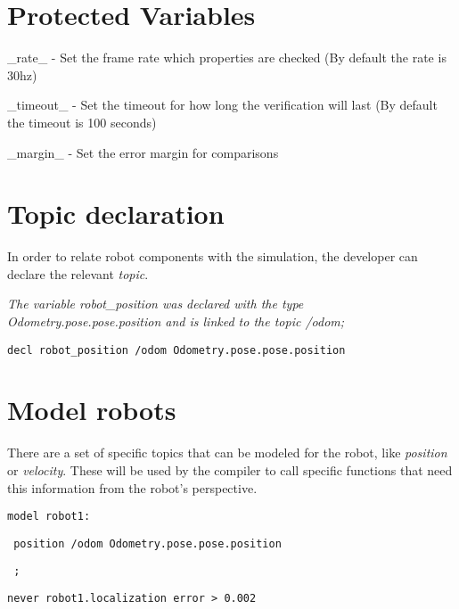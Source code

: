 \section{Protected Variables}

\_rate\_ - Set the frame rate which properties are checked (By default the rate is 30hz)

\_timeout\_ - Set the timeout for how long the verification will last (By default the timeout is 100 seconds)

\_margin\_ - Set the error margin for comparisons

\section{Topic declaration}

In order to relate robot components with the simulation, the developer can declare the relevant \textit{topic}.

\textit{The variable robot\_position was declared with the type Odometry.pose.pose.position and is linked to the topic /odom;}

\vspace{2mm}

\texttt{decl robot\_position /odom Odometry.pose.pose.position}

\section{Model robots}

There are a set of specific topics that can be modeled for the robot, like \textit{position} or \textit{velocity}. These will be used by the compiler to call specific functions that need this information from the robot's perspective.

\vspace{2mm}

\texttt{model robot1:}

\texttt{    position /odom Odometry.pose.pose.position}

\texttt{    ;}

\vspace{2mm}

\texttt{never robot1.localization error > 0.002}

